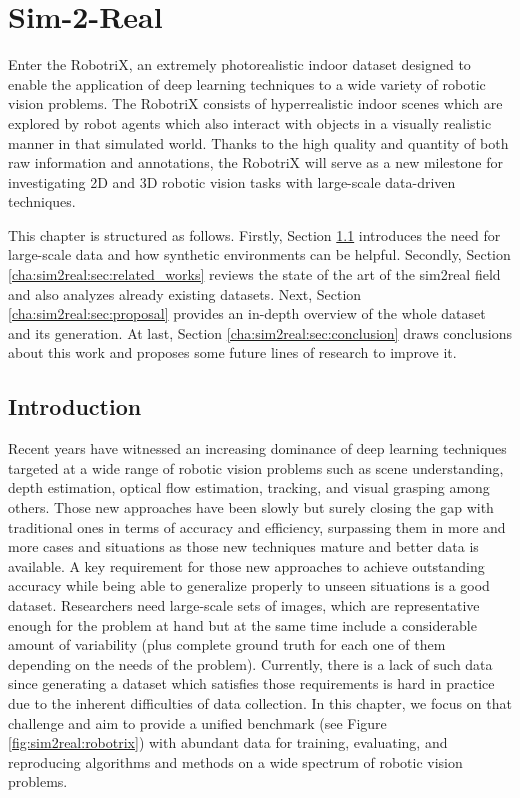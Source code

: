 \chapter{Sim-2-Real}
\label{cha:sim2real}

\begin{chapterabstract}
    Enter the RobotriX, an extremely photorealistic indoor dataset designed to enable the application of deep learning techniques to a wide variety of robotic vision problems. The RobotriX consists of hyperrealistic indoor scenes which are explored by robot agents which also interact with objects in a visually realistic manner in that simulated world. Thanks to the high quality and quantity of both raw information and annotations, the RobotriX will serve as a new milestone for investigating 2D and 3D robotic vision tasks with large-scale data-driven techniques.

    This chapter is structured as follows. Firstly, Section \ref{cha:sim2real:sec:introduction} introduces the need for large-scale data and how synthetic environments can be helpful. Secondly, Section \ref{cha:sim2real:sec:related_works} reviews the state of the art of the sim2real field and also analyzes already existing datasets. Next, Section \ref{cha:sim2real:sec:proposal} provides an in-depth overview of the whole dataset and its generation. At last, Section \ref{cha:sim2real:sec:conclusion} draws conclusions about this work and proposes some future lines of research to improve it.
\end{chapterabstract}

\minitoc

\clearpage

\section{Introduction}
\label{cha:sim2real:sec:introduction}

Recent years have witnessed an increasing dominance of deep learning techniques targeted at a wide range of robotic vision problems such as scene understanding, depth estimation, optical flow estimation, tracking, and visual grasping among others. Those new approaches have been slowly but surely closing the gap with traditional ones in terms of accuracy and efficiency, surpassing them in more and more cases and situations as those new techniques mature and better data is available. A key requirement for those new approaches to achieve outstanding accuracy while being able to generalize properly to unseen situations is a good dataset. Researchers need large-scale sets of images, which are representative enough for the problem at hand but at the same time include a considerable amount of variability (plus complete ground truth for each one of them depending on the needs of the problem). Currently, there is a lack of such data since generating a dataset which satisfies those requirements is hard in practice due to the inherent difficulties of data collection. In this chapter, we focus on that challenge and aim to provide a unified benchmark (see Figure \ref{fig:sim2real:robotrix}) with abundant data for training, evaluating, and reproducing algorithms and methods on a wide spectrum of robotic vision problems.

